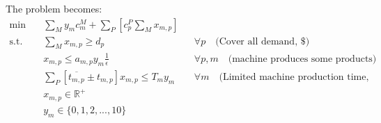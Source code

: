 \documentclass[fleqn,10pt]{wlscirep}
\begin{document}
The problem becomes:
\begin{align}
    \min \quad & \sum_{M} y_{m} c^{M}_{m} + \sum_{P} \left[c^{P}_{p} \sum_{M} x_{m, p} \right] \\
    \text{s.t.} \quad & \sum_{M} x_{m, p} \geq d_{p} && \forall p \quad \text{(Cover all demand, \$)} \\
    & x_{m, p} \leq a_{m, p} y_{m} \frac{1}{\epsilon} && \forall p, m \quad \text{(machine produces some products)} \\
    & \sum_{P} \left[\overline{t_{m, p}} \pm t_{m, p} \right] x_{m, p} \leq T_{m} y_{m} && \forall m \quad \text{(Limited machine production time, hour)} \\
    & x_{m, p} \in \mathbb{R}^+ \\
    & y_{m} \in \{0, 1, 2, ..., 10\}
\end{align}
\end{document}
